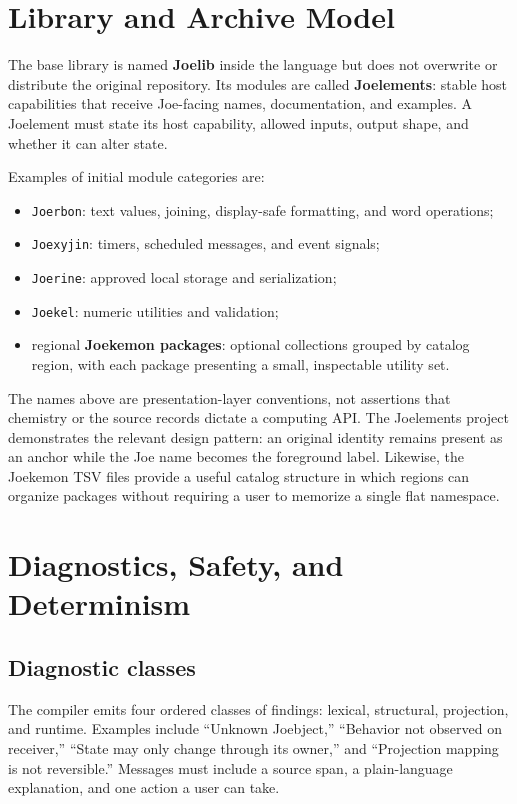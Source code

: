 \documentclass[12pt]{article}
\newcommand{\term}[1]{\textbf{#1}}
\begin{document}
\clearpage
\section{Library and Archive Model}
The base library is named \term{Joelib} inside the language but does not overwrite or distribute the original repository. Its modules are called \term{Joelements}: stable host capabilities that receive Joe-facing names, documentation, and examples. A Joelement must state its host capability, allowed inputs, output shape, and whether it can alter state.

Examples of initial module categories are:
\begin{itemize}
  \item \texttt{Joerbon}: text values, joining, display-safe formatting, and word operations;
  \item \texttt{Joexyjin}: timers, scheduled messages, and event signals;
  \item \texttt{Joerine}: approved local storage and serialization;
  \item \texttt{Joekel}: numeric utilities and validation;
  \item regional \term{Joekemon packages}: optional collections grouped by catalog region, with each package presenting a small, inspectable utility set.
\end{itemize}

The names above are presentation-layer conventions, not assertions that chemistry or the source records dictate a computing API. The Joelements project demonstrates the relevant design pattern: an original identity remains present as an anchor while the Joe name becomes the foreground label.\cite{joelements} Likewise, the Joekemon TSV files provide a useful catalog structure in which regions can organize packages without requiring a user to memorize a single flat namespace.\cite{joekemon}

\clearpage
\section{Diagnostics, Safety, and Determinism}
\subsection{Diagnostic classes}
The compiler emits four ordered classes of findings: lexical, structural, projection, and runtime. Examples include ``Unknown Joebject,'' ``Behavior not observed on receiver,'' ``State may only change through its owner,'' and ``Projection mapping is not reversible.'' Messages must include a source span, a plain-language explanation, and one action a user can take.
\end{document}
